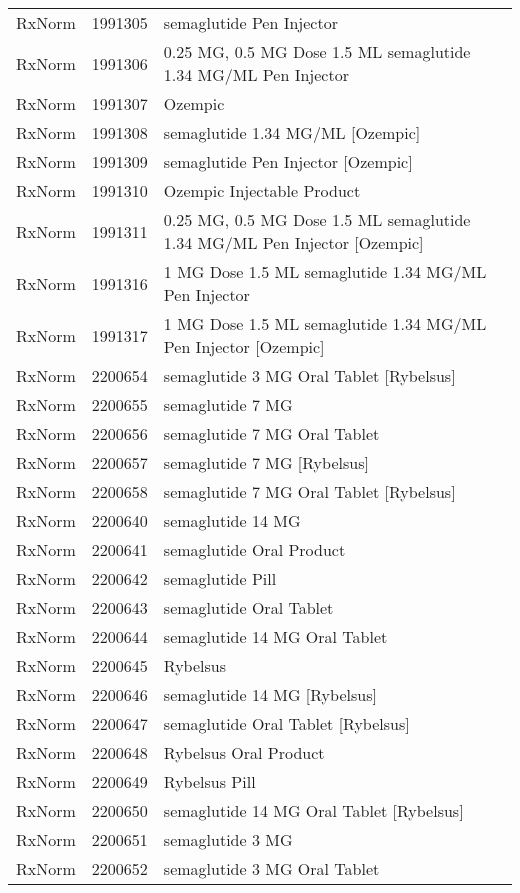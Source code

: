 \begin{longtable}{p{}p{}p{}}
  RxNorm & 1991305 & semaglutide Pen Injector \\ 
  RxNorm & 1991306 & 0.25 MG, 0.5 MG Dose 1.5 ML semaglutide 1.34 MG/ML Pen Injector \\ 
  RxNorm & 1991307 & Ozempic \\ 
  RxNorm & 1991308 & semaglutide 1.34 MG/ML [Ozempic] \\ 
  RxNorm & 1991309 & semaglutide Pen Injector [Ozempic] \\ 
  RxNorm & 1991310 & Ozempic Injectable Product \\ 
  RxNorm & 1991311 & 0.25 MG, 0.5 MG Dose 1.5 ML semaglutide 1.34 MG/ML Pen Injector [Ozempic] \\ 
  RxNorm & 1991316 & 1 MG Dose 1.5 ML semaglutide 1.34 MG/ML Pen Injector \\ 
  RxNorm & 1991317 & 1 MG Dose 1.5 ML semaglutide 1.34 MG/ML Pen Injector [Ozempic] \\ 
  RxNorm & 2200654 & semaglutide 3 MG Oral Tablet [Rybelsus] \\ 
  RxNorm & 2200655 & semaglutide 7 MG \\ 
  RxNorm & 2200656 & semaglutide 7 MG Oral Tablet \\ 
  RxNorm & 2200657 & semaglutide 7 MG [Rybelsus] \\ 
  RxNorm & 2200658 & semaglutide 7 MG Oral Tablet [Rybelsus] \\ 
  RxNorm & 2200640 & semaglutide 14 MG \\ 
  RxNorm & 2200641 & semaglutide Oral Product \\ 
  RxNorm & 2200642 & semaglutide Pill \\ 
  RxNorm & 2200643 & semaglutide Oral Tablet \\ 
  RxNorm & 2200644 & semaglutide 14 MG Oral Tablet \\ 
  RxNorm & 2200645 & Rybelsus \\ 
  RxNorm & 2200646 & semaglutide 14 MG [Rybelsus] \\ 
  RxNorm & 2200647 & semaglutide Oral Tablet [Rybelsus] \\ 
  RxNorm & 2200648 & Rybelsus Oral Product \\ 
  RxNorm & 2200649 & Rybelsus Pill \\ 
  RxNorm & 2200650 & semaglutide 14 MG Oral Tablet [Rybelsus] \\ 
  RxNorm & 2200651 & semaglutide 3 MG \\ 
  RxNorm & 2200652 & semaglutide 3 MG Oral Tablet \\ 

\end{longtable}
